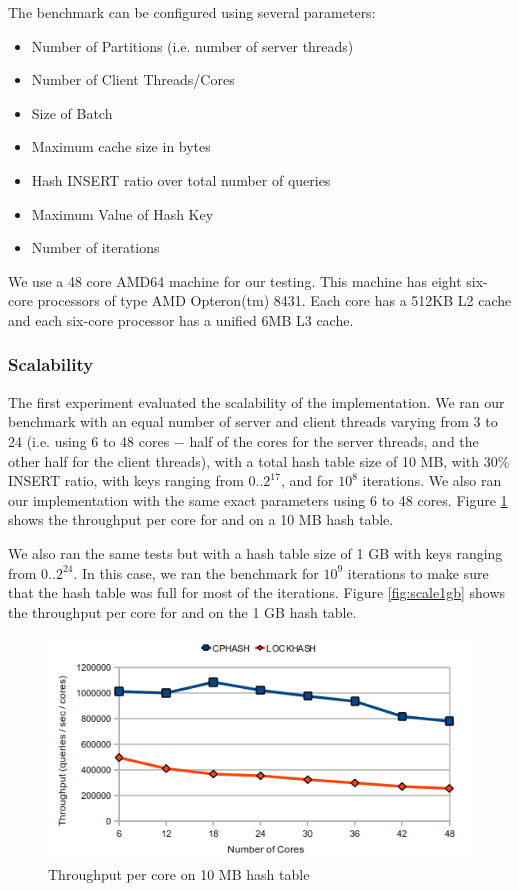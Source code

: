 The benchmark can be configured using several parameters:
\begin{itemize}
\item Number of Partitions (i.e. number of server threads)
\item Number of Client Threads/Cores
\item Size of Batch
\item Maximum cache size in bytes
\item Hash INSERT ratio over total number of queries
\item Maximum Value of Hash Key
\item Number of iterations
\end{itemize}

We use a 48 core AMD64 machine for our testing. This machine has eight six-core processors of type AMD Opteron(tm) 8431. Each core has
a 512KB L2 cache and each six-core processor has a unified 6MB L3 cache.

\subsubsection{Scalability}

The first experiment evaluated the scalability of the \cphash{} implementation. We ran our benchmark with an equal number of server 
and client threads varying from 3 to 24 (i.e. using 6 to 48 cores $-$ half of the cores for the server threads, and the other half for the 
client threads), with a total hash table size of 10 MB, with 30\% INSERT ratio, with keys ranging from 0..$2^{17}$, and for $10^{8}$ iterations. 
We also ran our \lockhash{} implementation with the same exact parameters using 6 to 48 cores. Figure \ref{fig:scale10mb} shows the 
throughput per core for \cphash{} and \lockhash{} on a 10 MB hash table.

We also ran the same tests but with a hash table size of 1 GB with keys ranging from 0..$2^{24}$. In this case, we ran the benchmark for $10^{9}$ iterations to make
sure that the hash table was full for most of the iterations. Figure \ref{fig:scale1gb} shows the throughput per core for \cphash{} and \lockhash{} on the
1 GB hash table.

\begin{figure}[!ht]
  \centering
  \includegraphics[width=\linewidth]{figs/scale10mb.png}
  \caption{Throughput per core on 10 MB hash table}
  \label{fig:scale10mb}
\end{figure}
    
